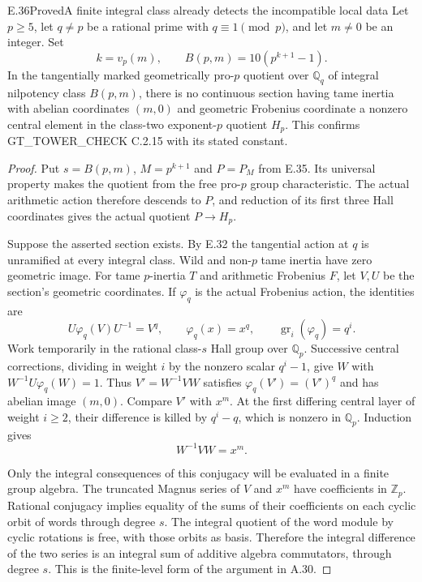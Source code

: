 \begin{result}{E.36}{Proved}{A finite integral class already detects the incompatible local data}
\label{coh:local-finite-exclusion}
Let $p\ge5$, let $q\ne p$ be a rational prime with $q\equiv1\pmod p$,
and let $m\ne0$ be an integer.  Set
\[
 k=v_p(m),\qquad B(p,m)=10(p^{k+1}-1).
 \tag{E.36.1}
\]
In the tangentially marked geometrically pro-$p$ quotient over
$\mathbb Q_q$ of integral nilpotency class $B(p,m)$, there is no
continuous section having tame inertia with abelian coordinates
$(m,0)$ and geometric Frobenius coordinate a nonzero central element
in the class-two exponent-$p$ quotient $H_p$.
This confirms GT\_TOWER\_CHECK C.2.15 with its stated constant.
\end{result}
\begin{proof}
Put $s=B(p,m)$, $M=p^{k+1}$ and $P=P_M$ from E.35.  Its universal
property makes the quotient from the free pro-$p$ group
characteristic.  The actual arithmetic action therefore descends
to $P$, and reduction of its first three Hall coordinates gives
the actual quotient $P\to H_p$.

Suppose the asserted section exists.  By E.32 the tangential
action at $q$ is unramified at every integral class.  Wild and
non-$p$ tame inertia have zero geometric image.  For tame
$p$-inertia $T$ and arithmetic Frobenius $F$, let $V,U$ be the
section's geometric coordinates.  If $\varphi_q$ is the actual
Frobenius action, the identities are
\[
 U\varphi_q(V)U^{-1}=V^q,\qquad
 \varphi_q(x)=x^q,\qquad
 \operatorname{gr}_i(\varphi_q)=q^i.
 \tag{E.36.2}
\]
Work temporarily in the rational class-$s$ Hall group over
$\mathbb Q_p$.  Successive central corrections, dividing in weight
$i$ by the nonzero scalar $q^i-1$, give $W$ with
$W^{-1}U\varphi_q(W)=1$.  Thus $V'=W^{-1}VW$ satisfies
$\varphi_q(V')=(V')^q$ and has abelian image $(m,0)$.
Compare $V'$ with $x^m$.  At the first differing central layer of
weight $i\ge2$, their difference is killed by $q^i-q$, which is
nonzero in $\mathbb Q_p$.  Induction gives
\[
                         W^{-1}VW=x^m.
 \tag{E.36.3}
\]

Only the integral consequences of this conjugacy will be evaluated
in a finite group algebra.  The truncated Magnus series of $V$
and $x^m$ have coefficients in $\mathbb Z_p$.  Rational conjugacy
implies equality of the sums of their coefficients on each cyclic
orbit of words through degree $s$.  The integral quotient of the
word module by cyclic rotations is free, with those orbits as
basis.  Therefore the integral difference of the two series is
an integral sum of additive algebra commutators, through degree
$s$.  This is the finite-level form of the argument in A.30.


\end{proof}
